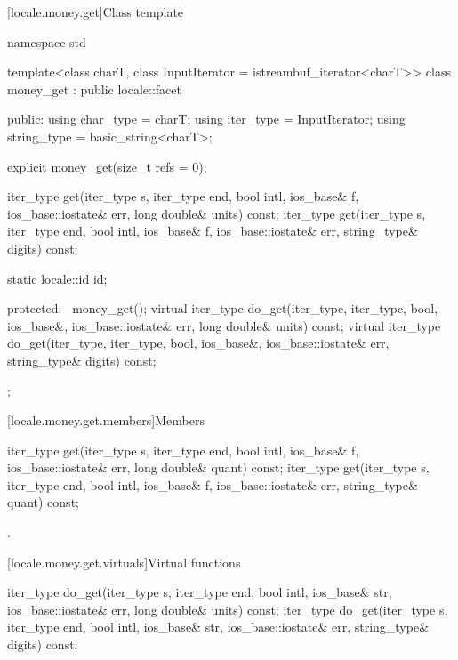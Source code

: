 [locale.money.get]{Class template }

%
\begin{codeblock}
namespace std {
  template<class charT, class InputIterator = istreambuf_iterator<charT>>
    class money_get : public locale::facet {
    public:
      using char_type   = charT;
      using iter_type   = InputIterator;
      using string_type = basic_string<charT>;

      explicit money_get(size_t refs = 0);

      iter_type get(iter_type s, iter_type end, bool intl,
                    ios_base& f, ios_base::iostate& err,
                    long double& units) const;
      iter_type get(iter_type s, iter_type end, bool intl,
                    ios_base& f, ios_base::iostate& err,
                    string_type& digits) const;

      static locale::id id;

    protected:
      ~money_get();
      virtual iter_type do_get(iter_type, iter_type, bool, ios_base&,
                               ios_base::iostate& err, long double& units) const;
      virtual iter_type do_get(iter_type, iter_type, bool, ios_base&,
                               ios_base::iostate& err, string_type& digits) const;
    };
}
\end{codeblock}

[locale.money.get.members]{Members}

%
\begin{itemdecl}
iter_type get(iter_type s, iter_type end, bool intl, ios_base& f,
              ios_base::iostate& err, long double& quant) const;
iter_type get(iter_type s, iter_type end, bool intl, ios_base& f,
              ios_base::iostate& err, string_type& quant) const;
\end{itemdecl}

\begin{itemdescr}
\pnum
\returns
{}.
\end{itemdescr}

[locale.money.get.virtuals]{Virtual functions}

%
\begin{itemdecl}
iter_type do_get(iter_type s, iter_type end, bool intl, ios_base& str,
                 ios_base::iostate& err, long double& units) const;
iter_type do_get(iter_type s, iter_type end, bool intl, ios_base& str,
                 ios_base::iostate& err, string_type& digits) const;
\end{itemdecl}

